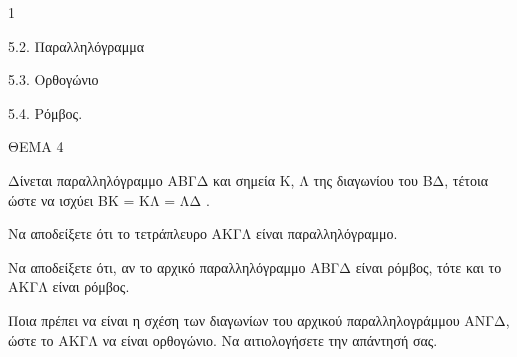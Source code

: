 \begin{ylh}{1}
    \item 5.2. Παραλληλόγραμμα
    \item 5.3. Ορθογώνιο
    \item 5.4. Ρόμβος.
\end{ylh}

ΘΕΜΑ 4

Δίνεται παραλληλόγραμμο ΑΒΓΔ και σημεία Κ, Λ της διαγωνίου του ΒΔ, τέτοια ώστε να ισχύει ΒΚ = ΚΛ = ΛΔ .

\begin{alist}
\item Να αποδείξετε ότι το τετράπλευρο ΑΚΓΛ είναι παραλληλόγραμμο. 

\item Να αποδείξετε ότι, αν το αρχικό παραλληλόγραμμο ΑΒΓΔ είναι ρόμβος, τότε και το ΑΚΓΛ είναι ρόμβος. 

\item Ποια πρέπει να είναι η σχέση των διαγωνίων του αρχικού παραλληλογράμμου ΑΝΓΔ, ώστε το ΑΚΓΛ να είναι ορθογώνιο. Να αιτιολογήσετε την απάντησή σας. 
\end{alist}

